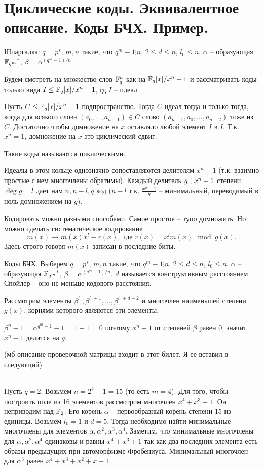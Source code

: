 \section{
 Циклические коды. Эквивалентное описание. Коды БЧХ. Пример.
}

Шпаргалка: $q = p^s$, $m, n$ такие, что $q^m-1 \vdots n$, $2 \le d \le n$, $l_0 \le n$. $\alpha$ -- образующая ${\mathbb{F}_{q^m}}^*$, $\beta=\alpha^{(q^m-1)/n}$



Будем смотреть на множество слов $\mathbb{F}_q^n$ как на $\mathbb{F}_q[x]/x^n-1$ и рассматривать коды только  вида $I \leq \mathbb{F}_q[x]/x^n-1$, гд $I$ -- идеал.


\thrm Пусть $C\leq \mathbb{F}_q[x]/x^n-1$ подпространство. Тогда $C$ идеал тогда и только тогда, когда для всякого слова $(a_0,\dots,a_{n-1})\in C$ слово $(a_{n-1},a_0,\dots,a_{n-2})$ тоже из $C$.
\proof
Достаточно чтобы домножение на $x$ оставляло любой элемент $I$ в $I$. Т.к. $x^n = 1$, домножение на $x$ это циклический сдвиг.
\endproof
\ethrm

\dfn Такие коды называются циклическими.
\edfn

Идеалы в этом кольце однозначно сопоставляются делителям $x^n-1$ (т.к. взаимно простые с нем многочлены обратимы). Каждый делитель $g \di x^n-1$ степени $\deg g = l$ дает нам $n, n-l, q$ код ($n-l$ т.к. $\frac {x^n-1} g$ -- минимальный, переводимый в ноль домножением на $g$).

Кодировать можно разными способами. Самое простое -- тупо домножить. Но можно сделать систематическое кодирование
$$m(x) \to m(x)x^{l}-r(x), \text{ где } r(x)=x^{l}m(x) \mod g(x).$$
Здесь строго говоря $m(x)$ записан в последние биты.

\dfn Коды БЧХ. Выберем $q = p^s$, $m, n$ такие, что $q^m-1 \vdots n$, $2 \le d \le n$, $l_0 \le n$. $\alpha$ -- образующая ${\mathbb{F}_{q^m}}^*$, $\beta=\alpha^{(q^m-1)/n}$.  $d$ называется конструктивным расстоянием. Спойлер -- оно не меньше кодового расстояния.

Рассмотрим элементы $\beta^{l_0},\beta^{l_0+1},\dots, \beta^{l_0+d-2}$ и многочлен наименьшей степени $g(x)$, корнями которого являются эти элементы.

$\beta^n - 1 = \alpha^{q^m-1} - 1 = 1-1 = 0$ поэтому $x^n-1$ от степеней $\beta$ равен $0$, значит $x^n-1$ делится на $g$.
\edfn

(мб описание проверочной матрицы входит в этот билет. Я ее вставил в следующий)

\\
Пусть $q=2$. Возьмём $n=2^4-1=15$ (то есть $m=4$). Для того, чтобы построить поле из 16 элементов рассмотрим многочлен $x^4+x^3+1$. Он неприводим над $\mathbb{F}_2$. Его корень $\alpha$ -- первообразный корень степени $15$ из единицы. Возьмём $l_0=1$ и $d=5$. Тогда необходимо найти минимальные многочлены для элементов $\alpha,\alpha^2,\alpha^3,\alpha^4$. Заметим, что минимальные многочлены для $\alpha,\alpha^2,\alpha^4$ одинаковы и равны $x^4+x^3+1$ так как два последних элемента есть образы предыдущих при автоморфизме Фробениуса. Минимальный многочлен для $\alpha^3$ равен $x^4+x^3+x^2+x+1$. 